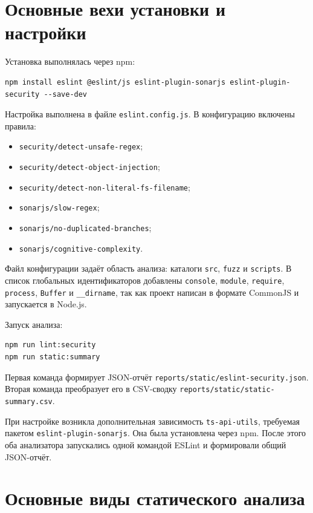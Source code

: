 \section{Основные вехи установки и настройки} \label{ch3:sec2}

Установка выполнялась через npm:
\begin{lstlisting}[breaklines=true]
npm install eslint @eslint/js eslint-plugin-sonarjs eslint-plugin-security --save-dev
\end{lstlisting}

Настройка выполнена в файле \texttt{eslint.config.js}. В конфигурацию включены
правила:
\begin{itemize}
    \item \texttt{security/detect-unsafe-regex};
    \item \texttt{security/detect-object-injection};
    \item \texttt{security/detect-non-literal-fs-filename};
    \item \texttt{sonarjs/slow-regex};
    \item \texttt{sonarjs/no-duplicated-branches};
    \item \texttt{sonarjs/cognitive-complexity}.
\end{itemize}

Файл конфигурации задаёт область анализа: каталоги \texttt{src}, \texttt{fuzz} и
\texttt{scripts}. В список глобальных идентификаторов добавлены \texttt{console},
\texttt{module}, \texttt{require}, \texttt{process}, \texttt{Buffer} и
\texttt{\_\_dirname}, так как проект написан в формате CommonJS и запускается в
Node.js.

Запуск анализа:
\begin{lstlisting}[breaklines=true]
npm run lint:security
npm run static:summary
\end{lstlisting}

Первая команда формирует JSON-отчёт \texttt{reports/static/eslint-security.json}.
Вторая команда преобразует его в CSV-сводку \texttt{reports/static/static-summary.csv}.

При настройке возникла дополнительная зависимость \texttt{ts-api-utils}, требуемая
пакетом \texttt{eslint-plugin-sonarjs}. Она была установлена через npm. После этого
оба анализатора запускались одной командой ESLint и формировали общий JSON-отчёт.

\section{Основные виды статического анализа} \label{ch3:sec3}

